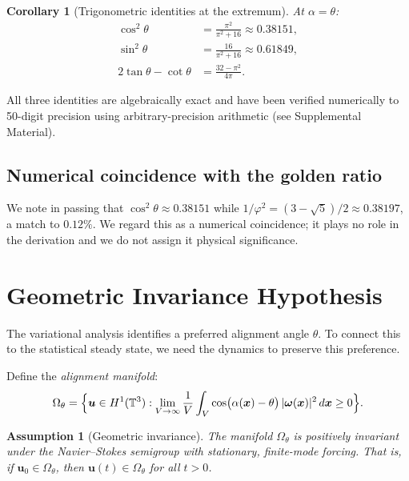 \documentclass[12pt,a4paper]{article}
\newtheorem{assumption}{Assumption}
\newtheorem{corollary}{Corollary}
\begin{document}
\begin{corollary}[Trigonometric identities at the extremum]
\label{cor:trig}
At $\alpha = \theta$:
\begin{align}
\cos^2\theta &= \frac{\pi^2}{\pi^2 + 16} \approx 0.38151, \label{eq:cos2} \\[4pt]
\sin^2\theta &= \frac{16}{\pi^2 + 16} \approx 0.61849, \label{eq:sin2} \\[4pt]
2\tan\theta - \cot\theta &= \frac{32 - \pi^2}{4\pi}. \label{eq:stationarity}
\end{align}
\end{corollary}

\noindent All three identities are algebraically exact and have been verified numerically to 50-digit precision using arbitrary-precision arithmetic (see Supplemental Material).

\subsection{Numerical coincidence with the golden ratio}

We note in passing that $\cos^2\theta \approx 0.38151$ while $1/\varphi^2 = (3 - \sqrt{5})/2 \approx 0.38197$, a match to $0.12\%$.
We regard this as a numerical coincidence; it plays no role in the derivation and we do not assign it physical significance.

\section{Geometric Invariance Hypothesis}
\label{sec:invariance}

The variational analysis identifies a preferred alignment angle $\theta$.
To connect this to the statistical steady state, we need the dynamics to preserve this preference.

Define the \emph{alignment manifold}:
\begin{equation}
\Omega_\theta = \Bigl\{\bm{u} \in H^1(\mathbb{T}^3) : \lim_{V\to\infty}\frac{1}{V}\int_V \cos\bigl(\alpha(\bm{x}) - \theta\bigr)\,|\bm{\omega}(\bm{x})|^2\,d\bm{x} \geq 0\Bigr\}.
\end{equation}

\begin{assumption}[Geometric invariance]
\label{ass:invariance}
The manifold $\Omega_\theta$ is positively invariant under the Navier--Stokes semigroup with stationary, finite-mode forcing.
That is, if $\bm{u}_0 \in \Omega_\theta$, then $\bm{u}(t) \in \Omega_\theta$ for all $t > 0$.
\end{assumption}
\end{document}
